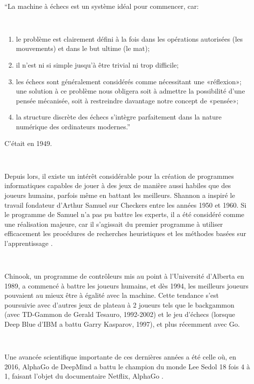 ~\par
“La machine à échecs est un système idéal pour commencer, car: 

~\par
\begin{enumerate}
\item le problème est clairement défini à la fois dans les opérations autorisées (les mouvements) et dans le but ultime (le mat); 
\item il n'est ni si simple jusqu'à être trivial ni trop difficile; 
\item les échecs sont généralement considérés comme nécessitant une «réflexion»; une solution à ce problème nous obligera soit à admettre la possibilité d'une pensée mécanisée, soit à restreindre davantage notre concept de «pensée»; 
\item la structure discrète des échecs s’intègre parfaitement dans la nature numérique des ordinateurs modernes.”

\end{enumerate}

C'était en 1949.

~\par
Depuis lors, il existe un intérêt considérable pour la création de programmes informatiques capables de jouer à des jeux de manière aussi habiles que des joueurs humains, parfois même en battant les meilleurs. Shannon a inspiré le travail fondateur d’Arthur Samuel sur Checkers entre les années 1950 et 1960. Si le programme de Samuel n’a pas pu battre les experts, il a été considéré comme une réalisation majeure, car il s’agissait du premier programme à utiliser efficacement les procédures de recherches heuristiques et les méthodes basées sur l’apprentissage \parencite{unity1}.


~\par
Chinook, un programme de contrôleurs mis au point à l’Université d'Alberta en 1989, a commencé à battre les joueurs humains, et dès 1994, les meilleurs joueurs pouvaient au mieux être à égalité avec la machine. Cette tendance s’est poursuivie avec d’autres jeux de plateau à 2 joueurs tels que le backgammon (avec TD-Gammon de Gerald Tesauro, 1992-2002) et le jeu d'échecs (lorsque Deep Blue d’IBM a battu Garry Kasparov, 1997), et plus récemment avec Go.

~\par
Une avancée scientifique importante de ces dernières années a été celle où, en 2016, AlphaGo de DeepMind a battu le champion du monde Lee Sedol 18 fois 4 à 1, faisant l’objet du documentaire Netflix, AlphaGo \parencite{unity2}. 



